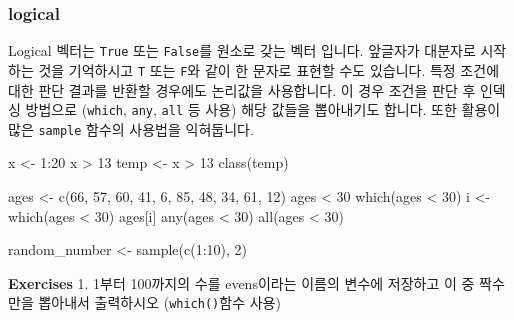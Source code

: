 \documentclass[
]{book}
\newenvironment{Shaded}{\begin{snugshade}}{\end{snugshade}}
\newcommand{\DecValTok}[1]{\textcolor[rgb]{0.00,0.00,0.81}{#1}}
\newcommand{\FunctionTok}[1]{\textcolor[rgb]{0.00,0.00,0.00}{#1}}
\newcommand{\NormalTok}[1]{#1}
\newcommand{\OtherTok}[1]{\textcolor[rgb]{0.56,0.35,0.01}{#1}}
\newcommand{\SpecialCharTok}[1]{\textcolor[rgb]{0.00,0.00,0.00}{#1}}
\begin{document}
\hypertarget{logical}{%
\subsubsection{logical}\label{logical}}

Logical 벡터는 \texttt{True} 또는 \texttt{False}를 원소로 갖는 벡터 입니다. 앞글자가 대분자로 시작하는 것을 기억하시고 \texttt{T} 또는 \texttt{F}와 같이 한 문자로 표현할 수도 있습니다. 특정 조건에 대한 판단 결과를 반환할 경우에도 논리값을 사용합니다. 이 경우 조건을 판단 후 인덱싱 방법으로 (\texttt{which}, \texttt{any}, \texttt{all} 등 사용) 해당 값들을 뽑아내기도 합니다. 또한 활용이 많은 \texttt{sample} 함수의 사용법을 익혀둡니다.

\begin{Shaded}
\begin{Highlighting}[]
\NormalTok{x }\OtherTok{\textless{}{-}} \DecValTok{1}\SpecialCharTok{:}\DecValTok{20}
\NormalTok{x }\SpecialCharTok{\textgreater{}} \DecValTok{13}
\NormalTok{temp }\OtherTok{\textless{}{-}}\NormalTok{ x }\SpecialCharTok{\textgreater{}} \DecValTok{13}
\FunctionTok{class}\NormalTok{(temp)}

\NormalTok{ages }\OtherTok{\textless{}{-}} \FunctionTok{c}\NormalTok{(}\DecValTok{66}\NormalTok{, }\DecValTok{57}\NormalTok{, }\DecValTok{60}\NormalTok{, }\DecValTok{41}\NormalTok{,  }\DecValTok{6}\NormalTok{, }\DecValTok{85}\NormalTok{, }\DecValTok{48}\NormalTok{, }\DecValTok{34}\NormalTok{, }\DecValTok{61}\NormalTok{, }\DecValTok{12}\NormalTok{)}
\NormalTok{ages }\SpecialCharTok{\textless{}} \DecValTok{30}
\FunctionTok{which}\NormalTok{(ages }\SpecialCharTok{\textless{}} \DecValTok{30}\NormalTok{)}
\NormalTok{i }\OtherTok{\textless{}{-}} \FunctionTok{which}\NormalTok{(ages }\SpecialCharTok{\textless{}} \DecValTok{30}\NormalTok{)}
\NormalTok{ages[i]}
\FunctionTok{any}\NormalTok{(ages }\SpecialCharTok{\textless{}} \DecValTok{30}\NormalTok{)}
\FunctionTok{all}\NormalTok{(ages }\SpecialCharTok{\textless{}} \DecValTok{30}\NormalTok{)}

\NormalTok{random\_number }\OtherTok{\textless{}{-}} \FunctionTok{sample}\NormalTok{(}\FunctionTok{c}\NormalTok{(}\DecValTok{1}\SpecialCharTok{:}\DecValTok{10}\NormalTok{), }\DecValTok{2}\NormalTok{)}
\end{Highlighting}
\end{Shaded}

\textbf{Exercises}
1. 1부터 100까지의 수를 evens이라는 이름의 변수에 저장하고 이 중 짝수만을 뽑아내서 출력하시오 (\texttt{which()}함수 사용)
\end{document}
